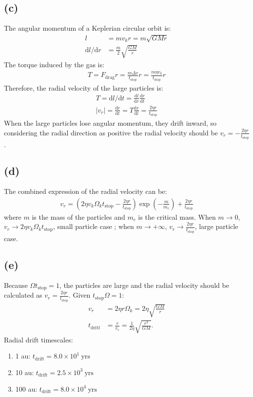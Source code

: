 \documentclass[a4paper,12pt]{article}
\renewcommand{\d}{\mathrm{d}}
\begin{document}
\subsection*{(c)}
The angular momentum of a Keplerian circular orbit is:
\begin{align*}
    l &= mv_k r = m\sqrt{GMr} \\
    \d l / \d r &= \frac{m}{2} \sqrt{\frac{GM}{r}}
\end{align*}
The torque induced by the gas is:
\begin{align*}
    T = F_\text{drag} r = \frac{m \Delta v}{t_\text{stop}} r = \frac{m \eta v_k}{t_\text{stop}} r
\end{align*}
Therefore, the radial velocity of the large particles is:
\begin{align*}
    T = \d l / \d t = \frac{\d l}{\d r} \frac{\d r}{\d t} \\
    \vert v_r \vert = \frac{\d r}{\d t} = T \frac{\d r}{\d l} = \frac{2\eta r}{t_\text{stop}}
\end{align*}
When the large particles lose angular momentum, they drift inward, so considering the radial direction as 
positive the radial velocity should be $v_r = - \frac{2\eta r}{t_\text{stop}}$.

\subsection*{(d)}
The combined expression of the radial velocity can be:
\begin{align*}
    v_r = (2\eta v_k \Omega_k t_\text{stop} - \frac{2\eta r}{t_\text{stop}})\exp(-\frac{m}{m_c}) + \frac{2\eta r}{t_\text{stop}}
\end{align*}
where $m$ is the mass of the particles and $m_c$ is the critical mass. When 
$m\rightarrow 0$, $v_r \rightarrow 2\eta v_k \Omega_k t_\text{stop}$, small particle case
; when $m\rightarrow +\infty$, $v_r \rightarrow \frac{2\eta r}{t_\text{stop}}$, large particle case.

\subsection*{(e)}
Because $\Omega t_\text{stop} = 1$, the particles are large and the radial velocity should be calculated as 
$v_r = \frac{2\eta r}{t_\text{stop}}$. Given $t_\text{stop} \Omega = 1$:
\begin{align*}
    v_r &= 2\eta r \Omega_k = 2\eta \sqrt{\frac{GM}{r}} \\
    t_\text{dritf} &= \frac{r}{v_r} = \frac{1}{2\eta} \sqrt{\frac{r^3}{GM}}.
\end{align*}
Radial drift timescales:
\begin{enumerate}
    \item[] 1 au: $t_\text{drift} = 8.0 \times 10^1 \ \text{yrs}$
    \item[] 10 au: $t_\text{drift} = 2.5 \times 10^3 \ \text{yrs}$ 
    \item[] 100 au: $t_\text{drift} = 8.0 \times 10^4 \ \text{yrs}$ 
\end{enumerate}
\end{document}
